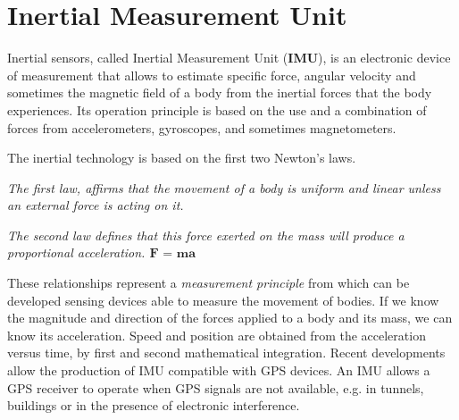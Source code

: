 \documentclass[tesi]{subfiles}
\begin{document}
\chapter{Inertial Measurement Unit}
\label{ch:Inertial Measurement Unit}
Inertial sensors, called Inertial Measurement Unit (\textbf{IMU}), is an electronic device of measurement that allows to estimate specific force, angular velocity and sometimes the magnetic field of a body from the inertial forces that the body experiences. Its operation principle is based on the use and a combination of forces from accelerometers, gyroscopes, and sometimes magnetometers.
\begin{center}
The inertial technology is based on the first two Newton’s laws. 

 \textit{The first law, affirms that the movement of a body is uniform and linear unless an external force is acting on it.} 

 \textit{The second law defines that this force exerted on the mass will produce a proportional acceleration. $ \textbf{F = ma} $
} 
\end{center} 

These relationships represent a \textit{measurement principle} from which can be developed sensing devices  able to measure the movement of bodies.
If we know the magnitude and direction of the forces applied to a body and its mass, we can know its acceleration. Speed and position are obtained from the acceleration versus time, by first and second mathematical integration.
Recent developments allow the production of IMU compatible with GPS devices. An IMU allows a GPS receiver to operate when GPS signals are not available, e.g. in tunnels, buildings or in the presence of electronic interference\cite{gpssystem}.
\end{document}
